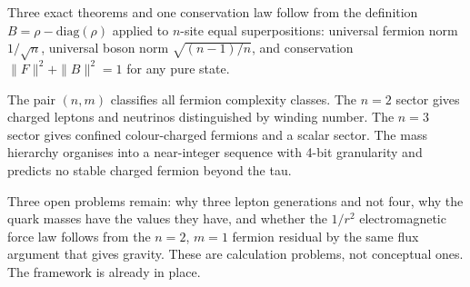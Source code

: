 Three exact theorems and one conservation law follow from the
definition $B = \rho - \mathrm{diag}(\rho)$ applied to $n$-site
equal superpositions: universal fermion norm $1/\sqrt{n}$, universal
boson norm $\sqrt{(n-1)/n}$, and conservation $\|F\|^2 + \|B\|^2 = 1$
for any pure state.

The pair $(n, m)$ classifies all fermion complexity classes. The
$n = 2$ sector gives charged leptons and neutrinos distinguished by
winding number. The $n = 3$ sector gives confined colour-charged
fermions and a scalar sector. The mass hierarchy organises into a
near-integer sequence with 4-bit granularity and predicts no stable
charged fermion beyond the tau.

Three open problems remain: why three lepton generations and not four,
why the quark masses have the values they have, and whether the $1/r^2$
electromagnetic force law follows from the $n = 2$, $m = 1$ fermion
residual by the same flux argument that gives gravity. These are
calculation problems, not conceptual ones. The framework is already
in place.
